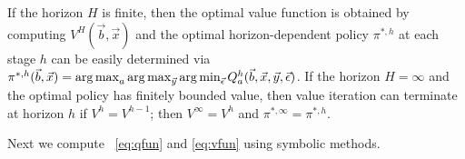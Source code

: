 If the horizon $H$ is finite, then the optimal value function is
obtained by computing $V^H(\vec{b},\vec{x})$ and the optimal
horizon-dependent policy $\pi^{*,h}$ at each stage $h$ can be easily
determined via $\pi^{*,h}(\vec{b},\vec{x}) = \argmax_a
\argmax_{\vec{y}}\argmin_{\vec{\epsilon}} Q^h_a(\vec{b},\vec{x},\vec{y},\vec{\epsilon})$.  If the horizon $H
= \infty$ and the optimal policy has finitely bounded value, then
value iteration can terminate at horizon $h$ if $V^{h} = V^{h-1}$;
then $V^\infty = V^h$ and $\pi^{*,\infty} = \pi^{*,h}$.

Next  we compute ~\eqref{eq:qfun} and \eqref{eq:vfun} using symbolic methods.